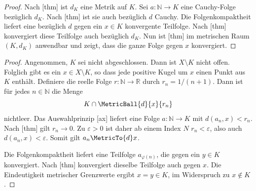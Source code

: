 \documentclass[main.tex]{subfiles}
\begin{document}
\begin{proof}
Nach [thm] ist \(d_K\) eine
Metrik auf \(K\). Sei \(a\colon\mathbb N\to K\) eine Cauchy-Folge bezüglich
\(d_K\). Nach [thm] ist sie auch
bezüglich \(d\) Cauchy. Die Folgenkompaktheit liefert eine bezüglich \(d\)
gegen ein \(x\in K\) konvergente Teilfolge. Nach
[thm] konvergiert diese
Teilfolge auch bezüglich \(d_K\). Nun ist
[thm] im metrischen Raum
\((K,d_K)\) anwendbar und zeigt, dass die ganze Folge gegen \(x\) konvergiert.
\end{proof}

\begin{proof}
Angenommen, \(K\) sei nicht abgeschlossen. Dann ist \(X\setminus K\) nicht
offen. Folglich gibt es ein \(x\in X\setminus K\), so dass jede positive
Kugel um \(x\) einen Punkt aus \(K\) enthält. Definiere die reelle Folge
\(r\colon\mathbb N\to\mathbb R\) durch \(r_n=1/(n+1)\). Dann ist für jedes
\(n\in\mathbb N\) die Menge
\[
 K\cap\MetricBall{d}{x}{r_n}
\]
nichtleer. Das Auswahlprinzip
[ax] liefert eine Folge
\(a\colon\mathbb N\to K\) mit
\(d(a_n,x)<r_n\). Nach
[thm] gilt
\(r_n\to0\). Zu \(\varepsilon>0\) ist daher ab einem Index \(N\)
\(r_n<\varepsilon\), also auch \(d(a_n,x)<\varepsilon\). Somit gilt
\(a_n\MetricTo{d}x\).

Die Folgenkompaktheit liefert eine Teilfolge \(a_{\varphi(n)}\), die gegen
ein \(y\in K\) konvergiert. Nach
[thm] konvergiert dieselbe
Teilfolge auch gegen \(x\). Die Eindeutigkeit metrischer Grenzwerte ergibt
\(x=y\in K\), im Widerspruch zu \(x\notin K\).
\end{proof}
\end{document}
